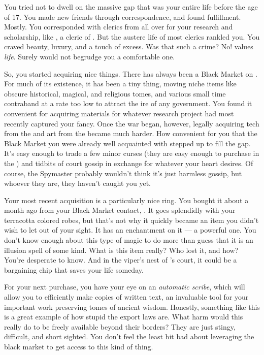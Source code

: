 \documentclass[char]{GL2020}
\begin{document}
You tried not to dwell on the massive gap that was your entire life before the age of 17. You made new friends through correspondence, and found fulfillment. Mostly. You corresponded with clerics from all over for your research and scholarship, like \cEbbPriest{\intro}, a cleric of \cEbb{\intro}. But the austere life of most clerics rankled you. You craved beauty, luxury, and a touch of excess. Was that such a crime? No! \cFarmGod{} values \emph{life}. Surely \cFarmGod{\They} would not begrudge you a comfortable one.

So, you started acquiring nice things. There has always been a Black Market on \pEarth{}. For much of its existence, it has been a tiny thing, moving niche items like obscure historical, magical, and religious tomes, and various small time contraband at a rate too low to attract the ire of any government. You found it convenient for acquiring materials for whatever research project had most recently captured your fancy. Once the war began, however, legally acquiring tech from the \pTech{} and art from the \pShip{} became much harder. How convenient for you that the Black Market you were already well acquainted with stepped up to fill the gap. It's easy enough to trade a few minor curses (they are easy enough to purchase in the \pFarm{}) and tidbits of court gossip in exchange for whatever your heart desires. Of course, the \pFarm{} Spymaster probably wouldn't think it's just harmless gossip, but whoever they are, they haven't caught you yet.

Your most recent acquisition is a particularly nice ring. You bought it about a month ago from your Black Market contact, \cChupSecond{\intro}. It goes splendidly with your terracotta colored robes, but that’s not why it quickly became an item you didn’t wish to let out of your sight. It has an enchantment on it — a powerful one. You don’t know enough about this type of magic to do more than guess that it is an illusion spell of some kind. What is this item really? Who lost it, and how? You’re desperate to know. And in the viper’s nest of \cQueen{\Majesty} \cQueen{\intro}’s court, it could be a bargaining chip that saves your life someday.

For your next purchase, you have your eye on an \emph{automatic scribe}, which will allow you to efficiently make copies of written text, an invaluable tool for your important work preserving tomes of ancient wisdom. Honestly, something like this is a great example of how stupid the \pTech{} export laws are. What harm would this really do to be freely available beyond their borders? They are just stingy, difficult, and short sighted. You don’t feel the least bit bad about leveraging the black market to get access to this kind of thing.
\end{document}
